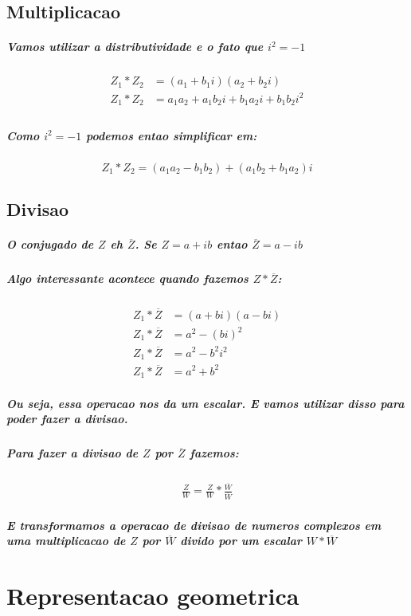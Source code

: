 \documentclass[12pt,twoside, a4paper, twocolumn]{article}
\begin{document}
\subsection{Multiplicacao}
\subparagraph{Vamos utilizar a distributividade e o fato que $i^2 = -1$}
\begin{equation*}
    \begin{aligned}
        Z_1 * Z_2 & = (a_1+b_1i)(a_2+b_2i)                    \\
        Z_1 * Z_2 & = a_1a_2 + a_1 b_2i + b_1a_2i + b_1b_2i^2 \\
    \end{aligned}
\end{equation*}
\subparagraph*{Como $i^2 = -1$ podemos entao simplificar em:}
\begin{equation}
    Z_1 * Z_2  = (a_1a_2- b_1b_2) + (a_1 b_2 + b_1a_2)i
\end{equation}

\subsection{Divisao}
\subparagraph{O conjugado de $Z$ eh $\overline{Z}$. Se $Z = a + ib$ entao  $\overline{Z} = a - ib$}
\subparagraph{Algo interessante acontece quando fazemos $Z * \overline{Z}$:}
\begin{equation}
    \begin{aligned}
        Z_1 * \overline{Z} & = (a+bi)(a-bi) \\
        Z_1 * \overline{Z} & = a^2 - (bi)^2 \\
        Z_1 * \overline{Z} & = a^2 - b^2i^2 \\
        Z_1 * \overline{Z} & = a^2 + b^2
    \end{aligned}
\end{equation}
\subparagraph{Ou seja, essa operacao nos da um escalar. E vamos utilizar disso para poder fazer a divisao.}
\subparagraph{Para fazer a divisao de $Z$ por $\overline{Z}$ fazemos:}
\begin{equation}
    \begin{aligned}
        \frac{Z}{W} = \frac{Z}{W} * \frac{\overline{W}}{\overline{W}}
    \end{aligned}
\end{equation}
\subparagraph{E transformamos a operacao de divisao de numeros complexos em uma multiplicacao de $Z$ por $\overline{W}$ divido por um escalar $W*\overline{W}$}


\section{Representacao geometrica}
\end{document}

